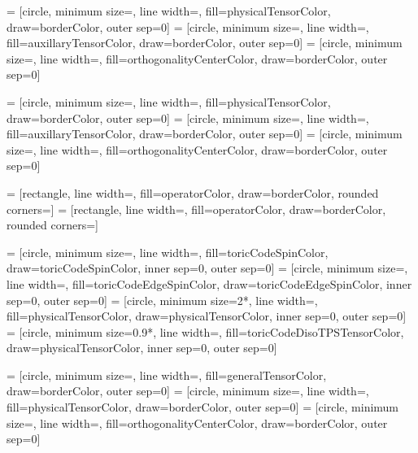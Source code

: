 \def\tensorDistanceMPS{1.2*\defaultDistanceSmall}
\def\braketDistanceMPS{1.2*\defaultDistanceNormal}
\def\tensorWidthMPS{\smallTensorWidth}
\def\openLegMultiplierMPS{0.9}

 = [circle, minimum size=, line width=, fill=physicalTensorColor, draw=borderColor, outer sep=0]
 = [circle, minimum size=, line width=, fill=auxillaryTensorColor, draw=borderColor, outer sep=0]
 = [circle, minimum size=, line width=, fill=orthogonalityCenterColor, draw=borderColor, outer sep=0]

 = [circle, minimum size=\smallTensorWidth, line width=, fill=physicalTensorColor, draw=borderColor, outer sep=0]
 = [circle, minimum size=\smallTensorWidth, line width=, fill=auxillaryTensorColor, draw=borderColor, outer sep=0]
 = [circle, minimum size=\smallTensorWidth, line width=, fill=orthogonalityCenterColor, draw=borderColor, outer sep=0]

 = [rectangle, line width=, fill=operatorColor, draw=borderColor, rounded corners=\roundedCornerInsetNormal]
 = [rectangle, line width=, fill=operatorColor, draw=borderColor, rounded corners=\roundedCornerInsetSmall]

 = [circle, minimum size=\tinyTensorWidth, line width=, fill=toricCodeSpinColor, draw=toricCodeSpinColor, inner sep=0, outer sep=0]
 = [circle, minimum size=\tinyTensorWidth, line width=, fill=toricCodeEdgeSpinColor, draw=toricCodeEdgeSpinColor, inner sep=0, outer sep=0]
 = [circle, minimum size=2*\tinyTensorWidth, line width=, fill=physicalTensorColor, draw=physicalTensorColor, inner sep=0, outer sep=0]
 = [circle, minimum size=0.9*, line width=, fill=toricCodeDisoTPSTensorColor, draw=physicalTensorColor, inner sep=0, outer sep=0]

 = [circle, minimum size=\smallTensorWidth, line width=, fill=generalTensorColor, draw=borderColor, outer sep=0]
 = [circle, minimum size=\smallTensorWidth, line width=, fill=physicalTensorColor, draw=borderColor, outer sep=0]
 = [circle, minimum size=\smallTensorWidth, line width=, fill=orthogonalityCenterColor, draw=borderColor, outer sep=0]


